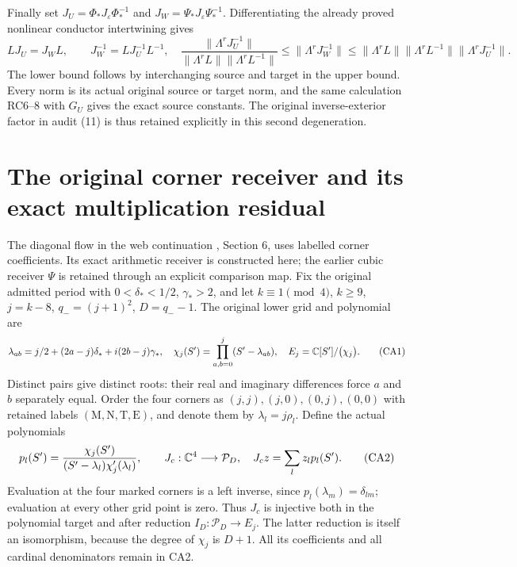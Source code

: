 Finally set $J_U=\Phi_*J_\varepsilon\Phi_*^{-1}$ and
$J_W=\Psi_*J_\varepsilon\Psi_*^{-1}$. Differentiating the already
proved nonlinear conductor intertwining gives
\[
 LJ_U=J_WL,\qquad
 J_W^{-1}=LJ_U^{-1}L^{-1},\quad
 \frac{\|\Lambda^rJ_U^{-1}\|}
      {\|\Lambda^rL\|\|\Lambda^rL^{-1}\|}
 \le\|\Lambda^rJ_W^{-1}\|
 \le\|\Lambda^rL\|\|\Lambda^rL^{-1}\|
                       \|\Lambda^rJ_U^{-1}\|. \tag{RC9}
\]
The lower bound follows by interchanging source and target in the
upper bound. Every norm is its actual original source or target
norm, and the same calculation RC6--8 with $G_U$ gives the exact
source constants. The original inverse-exterior factor in audit
(11) is thus retained explicitly in this second degeneration.

\section{The original corner receiver and its exact multiplication residual}
The diagonal flow in the web continuation \cite{fullfable:WebFable}, Section 6,
uses labelled corner coefficients. Its exact arithmetic receiver is
constructed here; the earlier cubic receiver $\Psi$ is retained through
an explicit comparison map. Fix the original admitted period with
$0<\delta_*<1/2$, $\gamma_*>2$, and let $k\equiv1\pmod4$,
$k\ge9$, $j=k-8$, $q_-=(j+1)^2$, $D=q_--1$. The original lower
grid and polynomial are
\[
 \lambda_{ab}=j/2+(2a-j)\delta_*+i(2b-j)\gamma_*,\quad
 \chi_j(S')=\prod_{a,b=0}^j(S'-\lambda_{ab}),\quad
 E_j=\mathbb C[S']/\bigl(\chi_j\bigr). \tag{CA1}
\]
Distinct pairs give distinct roots: their real and imaginary
differences force $a$ and $b$ separately equal. Order the four corners
as $(j,j),(j,0),(0,j),(0,0)$ with retained labels
$(\mathrm M,\mathrm N,\mathrm T,\mathrm E)$, and denote them by
$\lambda_l=j\rho_l$. Define the actual polynomials
\[
 p_l(S')=\frac{\chi_j(S')}
 {(S'-\lambda_l)\chi_j'(\lambda_l)},\qquad
 J_c:\mathbb C^4\longrightarrow\mathcal P_D,\quad
 J_c z=\sum_l z_l p_l(S'). \tag{CA2}
\]
Evaluation at the four marked corners is a left inverse, since
$p_l(\lambda_m)=\delta_{lm}$; evaluation at every other grid
point is zero. Thus $J_c$ is injective both in the polynomial
target and after reduction $I_D:\mathcal P_D\to E_j$.
The latter reduction is itself an isomorphism, because the
degree of $\chi_j$ is $D+1$. All its coefficients and all
cardinal denominators remain in CA2.

